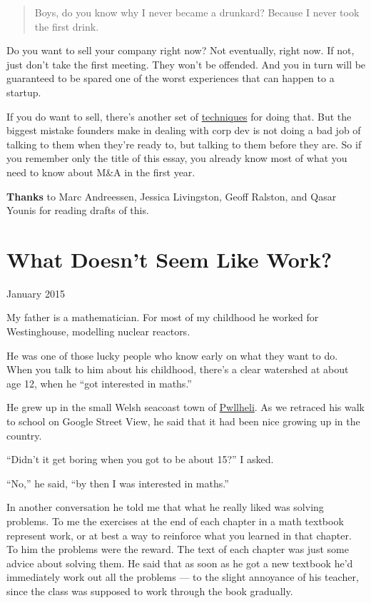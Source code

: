 \documentclass[12pt]{book}
\begin{document}
\begin{quote}
Boys, do you know why I never became a drunkard? Because I never took
the first drink.
\end{quote}

Do you want to sell your company right now? Not eventually, right now.
If not, just don't take the first meeting. They won't be offended. And
you in turn will be guaranteed to be spared one of the worst experiences
that can happen to a startup.

If you do want to sell, there's another set of
\href{https://justinkan.com/the-founders-guide-to-selling-your-company-a1b2025c9481}{techniques}
for doing that. But the biggest mistake founders make in dealing with
corp dev is not doing a bad job of talking to them when they're ready
to, but talking to them before they are. So if you remember only the
title of this essay, you already know most of what you need to know
about M\&A in the first year.


\textbf{Thanks} to Marc Andreessen, Jessica Livingston, Geoff Ralston,
and Qasar Younis for reading drafts of this.
\chapter{What Doesn't Seem Like Work?}

January 2015

My father is a mathematician. For most of my childhood he worked for
Westinghouse, modelling nuclear reactors.

He was one of those lucky people who know early on what they want to do.
When you talk to him about his childhood, there's a clear watershed at
about age 12, when he ``got interested in maths.''

He grew up in the small Welsh seacoast town of
\href{https://goo.gl/maps/rkzUm}{Pwllheli}. As we retraced his walk to
school on Google Street View, he said that it had been nice growing up
in the country.

``Didn't it get boring when you got to be about 15?'' I asked.

``No,'' he said, ``by then I was interested in maths.''

In another conversation he told me that what he really liked was solving
problems. To me the exercises at the end of each chapter in a math
textbook represent work, or at best a way to reinforce what you learned
in that chapter. To him the problems were the reward. The text of each
chapter was just some advice about solving them. He said that as soon as
he got a new textbook he'd immediately work out all the problems --- to
the slight annoyance of his teacher, since the class was supposed to
work through the book gradually.
\end{document}
